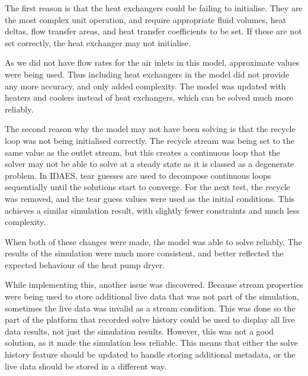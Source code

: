 The first reason is that the heat exchangers could be failing to initialise. They are the most complex unit operation, and require appropriate fluid volumes, heat deltas, flow transfer areas, and heat transfer coefficients to be set. If these are not set correctly, the heat exchanger may not initialise. 

As we did not have flow rates for the air inlets in this model, approximate values were being used. Thus including heat exchangers in the model did not provide any more accuracy, and only added complexity. The model was updated with heaters and coolers instead of heat exchangers, which can be solved much more reliably.

The second reason why the model may not have been solving is that the recycle loop was not being initialised correctly. The recycle stream was being set to the same value as the outlet stream, but this creates a continuous loop that the solver may not be able to solve at a steady state as it is classed as a degenerate problem.
In IDAES, tear guesses are used to decompose continuous loops sequentially until the solutions start to converge.
For the next test, the recycle was removed, and the tear guess values were used as the initial conditions. This achieves a similar simulation result, with slightly fewer constraints and much less complexity.


When both of these changes were made, the model was able to solve reliably. The results of the simulation were much more consistent, and better reflected the expected behaviour of the heat pump dryer.


While implementing this, another issue was discovered. Because stream properties were being used to store additional live data that was not part of the simulation, sometimes the live data was invalid as a stream condition. This was done so the part of the platform that recorded solve history could be used to display all live data results, not just the simulation results. However, this was not a good solution, as it made the simulation less reliable. This means that either the solve history feature should be updated to handle storing additional metadata, or the live data should be stored in a different way.




